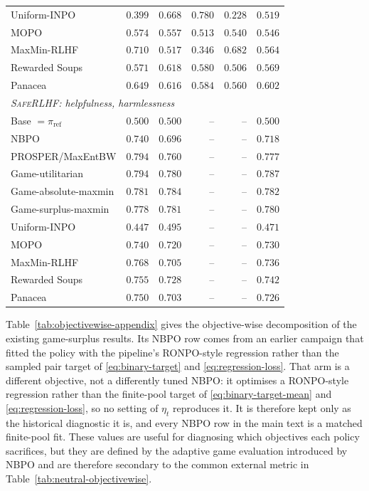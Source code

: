 \documentclass{article}
\theoremstyle{remark}
\theoremstyle{plain}
\newcommand{\piref}{\pi_{\mathrm{ref}}}
\newcommand{\NBPO}{\textsc{NBPO}}
\begin{document}
\begin{table}[t]
\begin{tabular}{lrrrrr}
Uniform-INPO & $0.399$ & $0.668$ & $0.780$ & $0.228$ & $0.519$\\
MOPO & $0.574$ & $0.557$ & $0.513$ & $0.540$ & $0.546$\\
MaxMin-RLHF & $0.710$ & $0.517$ & $0.346$ & $0.682$ & $0.564$\\
Rewarded Soups & $0.571$ & $0.618$ & $0.580$ & $0.506$ & $0.569$\\
Panacea & $0.649$ & $0.616$ & $0.584$ & $0.560$ & $0.602$\\
\midrule
\multicolumn{6}{l}{\textit{\textsc{SafeRLHF}: helpfulness, harmlessness}}\\
Base $=\piref$ & $0.500$ & $0.500$ & -- & -- & $0.500$\\
\NBPO{} & $0.740$ & $0.696$ & -- & -- & $0.718$\\
PROSPER/MaxEntBW & $0.794$ & $0.760$ & -- & -- & $0.777$\\
Game-utilitarian & $0.794$ & $0.780$ & -- & -- & $0.787$\\
Game-absolute-maxmin & $0.781$ & $0.784$ & -- & -- & $0.782$\\
Game-surplus-maxmin & $0.778$ & $0.781$ & -- & -- & $0.780$\\
Uniform-INPO & $0.447$ & $0.495$ & -- & -- & $0.471$\\
MOPO & $0.740$ & $0.720$ & -- & -- & $0.730$\\
MaxMin-RLHF & $0.768$ & $0.705$ & -- & -- & $0.736$\\
Rewarded Soups & $0.755$ & $0.728$ & -- & -- & $0.742$\\
Panacea & $0.750$ & $0.703$ & -- & -- & $0.726$\\
\bottomrule
\end{tabular}
\end{table}

Table~\ref{tab:objectivewise-appendix} gives the objective-wise decomposition of the existing
game-surplus results. Its \NBPO{} row comes from an earlier campaign that fitted the policy with
the pipeline's RONPO-style regression rather than the sampled pair target of
\eqref{eq:binary-target} and \eqref{eq:regression-loss}. That arm is a different objective, not a
differently tuned \NBPO{}: it optimises a RONPO-style regression rather than the finite-pool target
of \eqref{eq:binary-target-mean} and \eqref{eq:regression-loss}, so no setting of $\eta_t$
reproduces it. It is therefore kept only as the historical diagnostic it is, and every \NBPO{} row
in the main text is a matched finite-pool fit. These values are useful for diagnosing which objectives each policy sacrifices, but they are defined by the adaptive game evaluation introduced by NBPO and are therefore secondary to the common external metric in Table~\ref{tab:neutral-objectivewise}.
\end{document}
